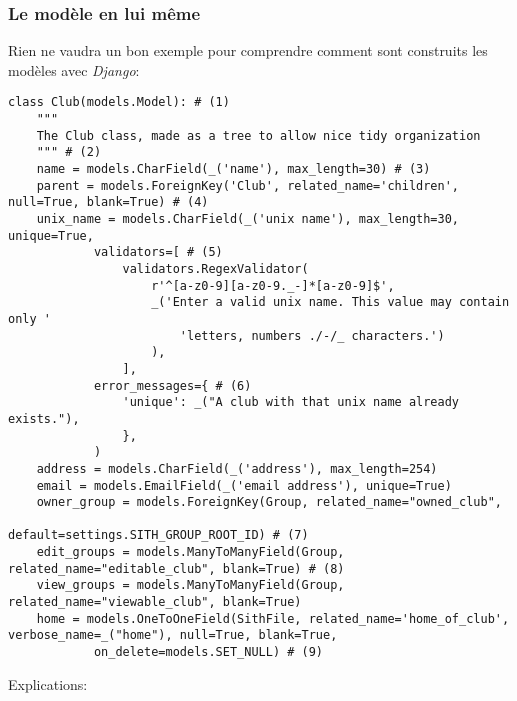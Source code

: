 \documentclass[a4paper]{report}
\begin{document}
\subsubsection{Le modèle en lui même}
\label{ssub:Le modèle en lui même}
\par Rien ne vaudra un bon exemple pour comprendre comment sont construits les modèles avec \emph{Django}:
\begin{addmargin}[-7em]{0em}
    \begin{verbatim}
class Club(models.Model): # (1)
    """
    The Club class, made as a tree to allow nice tidy organization
    """ # (2)
    name = models.CharField(_('name'), max_length=30) # (3)
    parent = models.ForeignKey('Club', related_name='children', null=True, blank=True) # (4)
    unix_name = models.CharField(_('unix name'), max_length=30, unique=True,
            validators=[ # (5)
                validators.RegexValidator(
                    r'^[a-z0-9][a-z0-9._-]*[a-z0-9]$',
                    _('Enter a valid unix name. This value may contain only '
                        'letters, numbers ./-/_ characters.')
                    ),
                ],
            error_messages={ # (6)
                'unique': _("A club with that unix name already exists."),
                },
            )
    address = models.CharField(_('address'), max_length=254)
    email = models.EmailField(_('email address'), unique=True)
    owner_group = models.ForeignKey(Group, related_name="owned_club",
                                    default=settings.SITH_GROUP_ROOT_ID) # (7)
    edit_groups = models.ManyToManyField(Group, related_name="editable_club", blank=True) # (8)
    view_groups = models.ManyToManyField(Group, related_name="viewable_club", blank=True)
    home = models.OneToOneField(SithFile, related_name='home_of_club', verbose_name=_("home"), null=True, blank=True,
            on_delete=models.SET_NULL) # (9)
\end{verbatim}
\end{addmargin}
\par Explications:
\end{document}
